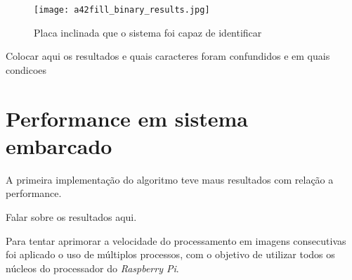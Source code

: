 \begin{figure}[H]
	\centering
	\texttt{[image: a42fill\_binary\_results.jpg]}
	\caption{Placa inclinada que o sistema foi capaz de identificar}
	\label{fig:plate_torta_result}
\end{figure}

Colocar aqui os resultados e quais caracteres foram confundidos e em quais condicoes

\section{Performance em sistema embarcado}
\label{sec:performance_resultados}

A primeira implementação do algoritmo teve maus resultados com relação a performance. 

Falar sobre os resultados aqui. 

Para tentar aprimorar a velocidade do processamento em imagens consecutivas foi aplicado o uso de múltiplos processos, com o objetivo de utilizar todos os núcleos do processador do \emph{Raspberry Pi}.
